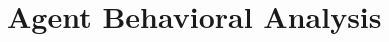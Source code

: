 \documentclass{article} %
\newcommand{\K}{\mathcal{K}}
\newcommand{\saaket}[1]{\textcolor{blue}{[Saaket: #1]}}
\begin{document}



\section{Agent Behavioral Analysis}
\label{sec:behaviors}
\end{document}
